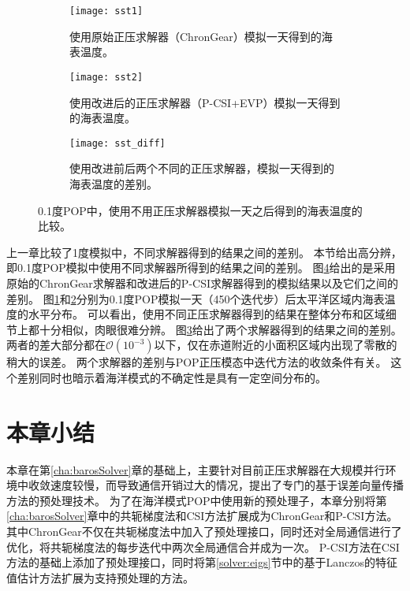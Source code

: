 \begin{figure}[!t]
\centering
\begin{subfigure}[t]{1\textwidth}
\centering
\vspace{-20pt}
\texttt{[image: sst1]}
\vspace{-20pt}
\caption{使用原始正压求解器（ChronGear）模拟一天得到的海表温度。\label {fig:sst1}
}
\end{subfigure}
\begin{subfigure}[t]{1\textwidth}
\centering
\vspace{-5pt}
\texttt{[image: sst2]}
\vspace{-20pt}
\caption{使用改进后的正压求解器（P-CSI+EVP）模拟一天得到的海表温度。\label {fig:sst2}}
\end{subfigure}
\begin{subfigure}[t]{1\textwidth}
\centering
\vspace{-5pt}
\texttt{[image: sst\_diff]}
\vspace{-20pt}
\caption{使用改进前后两个不同的正压求解器，模拟一天得到的海表温度的差别。\label {fig:sst3}}
\vspace{5pt}
\end{subfigure}
\caption{0.1度POP中，使用不用正压求解器模拟一天之后得到的海表温度的比较。}
\label {fig:sst}
\end {figure}

上一章比较了1度模拟中，不同求解器得到的结果之间的差别。 
本节给出高分辨，即0.1度POP模拟中使用不同求解器所得到的结果之间的差别。
图\ref{fig:sst}给出的是采用原始的ChronGear求解器和改进后的P-CSI求解器得到的模拟结果以及它们之间的差别。
图\ref{fig:sst1}和\ref{fig:sst2}分别为0.1度POP模拟一天（450个迭代步）后太平洋区域内海表温度的水平分布。
可以看出，使用不同正压求解器得到的结果在整体分布和区域细节上都十分相似，肉眼很难分辨。
图\ref{fig:sst3}给出了两个求解器得到的结果之间的差别。两者的差大部分都在$\mathcal{O}(10^{-3})$以下，仅在赤道附近的小面积区域内出现了零散的稍大的误差。
两个求解器的差别与POP正压模态中迭代方法的收敛条件有关。
这个差别同时也暗示着海洋模式的不确定性是具有一定空间分布的。

\section{本章小结}
\label{precond:Conclusion}

本章在第\ref{cha:barosSolver}章的基础上，主要针对目前正压求解器在大规模并行环境中收敛速度较慢，而导致通信开销过大的情况，提出了专门的基于误差向量传播方法的预处理技术。
为了在海洋模式POP中使用新的预处理子，本章分别将第\ref{cha:barosSolver}章中的共轭梯度法和CSI方法扩展成为ChronGear和P-CSI方法。
其中ChronGear不仅在共轭梯度法中加入了预处理接口，同时还对全局通信进行了优化，将共轭梯度法的每步迭代中两次全局通信合并成为一次。 
P-CSI方法在CSI方法的基础上添加了预处理接口，同时将第\ref{solver:eigs}节中的基于Lanczos的特征值估计方法扩展为支持预处理的方法。


